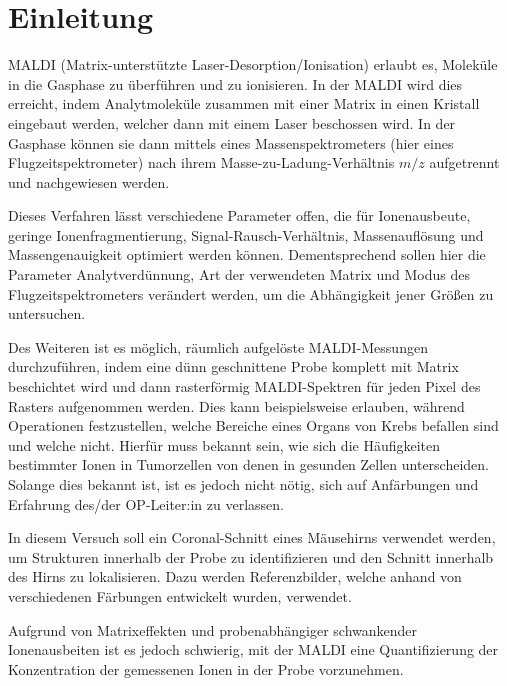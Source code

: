 \section{Einleitung}


  MALDI (Matrix-unterstützte Laser-Desorption/Ionisation) erlaubt es, Moleküle in die Gasphase zu überführen und zu ionisieren.
  In der MALDI wird dies erreicht, indem Analytmoleküle zusammen mit einer Matrix in einen Kristall eingebaut werden, welcher dann mit einem Laser beschossen wird.
  In der Gasphase können sie dann mittels eines Massenspektrometers (hier eines Flugzeitspektrometer) nach ihrem Masse-zu-Ladung-Verhältnis $m/z$ aufgetrennt und nachgewiesen werden.

  Dieses Verfahren lässt verschiedene Parameter offen, die für Ionenausbeute, geringe Ionenfragmentierung, Signal-Rausch-Verhältnis, Massenauflösung und Massengenauigkeit optimiert werden können.
  Dementsprechend sollen hier die Parameter Analytverdünnung, Art der verwendeten Matrix und Modus des Flugzeitspektrometers verändert werden, um die Abhängigkeit jener Größen zu untersuchen.

  Des Weiteren ist es möglich, räumlich aufgelöste MALDI-Messungen durchzuführen, indem eine dünn geschnittene Probe komplett mit Matrix beschichtet wird und dann rasterförmig MALDI-Spektren für jeden Pixel des Rasters aufgenommen werden.
  Dies kann beispielsweise erlauben, während Operationen festzustellen, welche Bereiche eines Organs von Krebs befallen sind und welche nicht.
  Hierfür muss bekannt sein, wie sich die Häufigkeiten bestimmter Ionen in Tumorzellen von denen in gesunden Zellen unterscheiden.
  Solange dies bekannt ist, ist es jedoch nicht nötig, sich auf Anfärbungen und Erfahrung des/der OP-Leiter:in zu verlassen.

  In diesem Versuch soll ein Coronal-Schnitt eines Mäusehirns verwendet werden, um Strukturen innerhalb der Probe zu identifizieren und den Schnitt innerhalb des Hirns zu lokalisieren.
  Dazu werden Referenzbilder, welche anhand von verschiedenen Färbungen entwickelt wurden, verwendet.

  Aufgrund von Matrixeffekten und probenabhängiger schwankender Ionenausbeiten ist es jedoch schwierig, mit der MALDI eine Quantifizierung der Konzentration der gemessenen Ionen in der Probe vorzunehmen.

